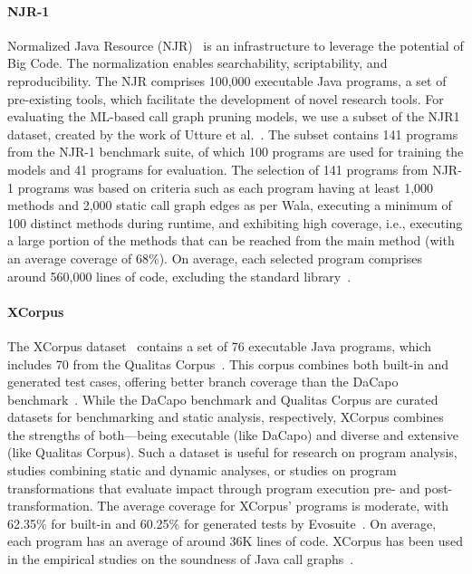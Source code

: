 \paragraph{NJR-1}
Normalized Java Resource (NJR)~\cite{palsberg2018njr} is an infrastructure to leverage the potential of Big Code. The normalization enables searchability, scriptability, and reproducibility. The NJR comprises 100,000 executable Java programs, a set of pre-existing tools, which facilitate the development of novel research tools. For evaluating the ML-based call graph pruning models, we use a subset of the NJR1 dataset, created by the work of Utture et al.~\cite{utture2022striking}. The subset contains 141 programs from the NJR-1 benchmark suite, of which 100 programs are used for training the models and 41 programs for evaluation. The selection of 141 programs from NJR-1 programs was based on criteria such as each program having at least 1,000 methods and 2,000 static call graph edges as per Wala, executing a minimum of 100 distinct methods during runtime, and exhibiting high coverage, i.e., executing a large portion of the methods that can be reached from the main method (with an average coverage of 68\%). On average, each selected program comprises around 560,000 lines of code, excluding the standard library~\cite{utture2022striking}. 

\paragraph{XCorpus}
The XCorpus dataset~\cite{dietrich2017xcorpus} contains a set of 76 executable Java programs, which includes 70 from the Qualitas Corpus~\cite{tempero2010qualitas}. This corpus combines both built-in and generated test cases, offering better branch coverage than the DaCapo benchmark~\cite{blackburn2006dacapo}. While the DaCapo benchmark and Qualitas Corpus are curated datasets for benchmarking and static analysis, respectively, XCorpus combines the strengths of both—being executable (like DaCapo) and diverse and extensive (like Qualitas Corpus). Such a dataset is useful for research on program analysis, studies combining static and dynamic analyses, or studies on program transformations that evaluate impact through program execution pre- and post-transformation. The average coverage for XCorpus' programs is moderate, with 62.35\% for built-in and 60.25\% for
generated tests by Evosuite~\cite{fraser2011evosuite}. On average, each program has an average of around 36K lines of code. XCorpus has been used in the empirical studies on the soundness of Java call graphs~\cite{sui2020recall, reif2019judge}.

